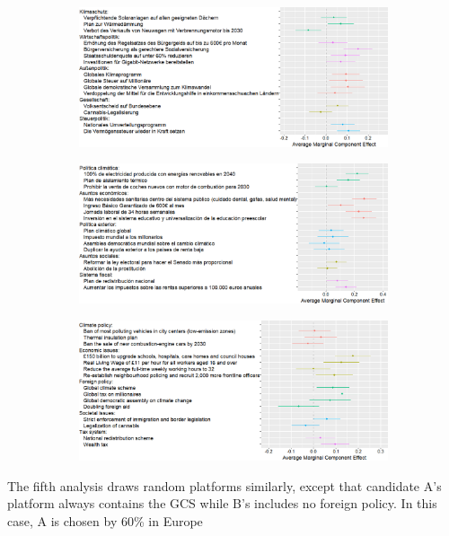 \begin{figure}[h!]\ContinuedFloat %
  \begin{subfigure}{\textwidth}
    \includegraphics[width=\textwidth]{../figures/DE/ca_r.png}
  \end{subfigure}
  \begin{subfigure}{\textwidth}
    \includegraphics[width=\textwidth]{../figures/ES/ca_r.png}
  \end{subfigure}
  \begin{subfigure}{\textwidth}
    \includegraphics[width=\textwidth]{../figures/UK/ca_r.png}
  \end{subfigure}
\end{figure}
\clearpage 
\noindent 
The fifth analysis draws random platforms similarly, except that candidate A's platform always contains the GCS while B's includes no foreign policy. In this case, A is chosen by 60\% in Europe %
